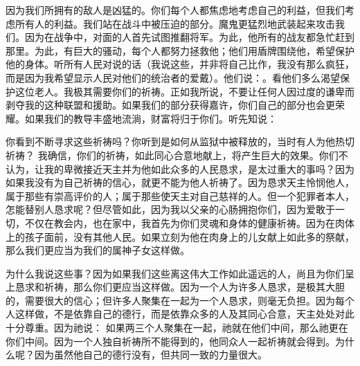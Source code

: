 因为我们所拥有的敌人是凶猛的。你们每个人都焦虑地考虑自己的利益，但我们考虑所有人的利益。我们站在战斗中被压迫的部分。魔鬼更猛烈地武装起来攻击我们。因为在战争中，对面的人首先试图推翻将军。为此，他所有的战友都急忙赶到那里。为此，有巨大的骚动，每个人都努力拯救他；他们用盾牌围绕他，希望保护他的身体。听所有人民对说的话（我说这些，并非将自己比作，我没有那么疯狂，而是因为我希望显示人民对他们的统治者的爱戴）。他们说：。看他们多么渴望保护这位老人。我极其需要你们的祈祷。正如我所说，不要让任何人因过度的谦卑而剥夺我的这种联盟和援助。如果我们的部分获得嘉许，你们自己的部分也会更荣耀。如果我们的教导丰盛地流淌，财富将归于你们。听先知说：\par

你看到不断寻求这些祈祷吗？你听到是如何从监狱中被释放的，当时有人为他热切祈祷？ 我确信，你们的祈祷，如此同心合意地献上，将产生巨大的效果。你们不认为，让我的卑微接近天主并为他如此众多的人民恳求，是太过重大的事吗？因为如果我没有为自己祈祷的信心，就更不能为他人祈祷了。因为恳求天主怜悯他人，属于那些有崇高评价的人；属于那些使天主对自己慈祥的人。但一个犯罪者本人，怎能替别人恳求呢？但尽管如此，因为我以父亲的心肠拥抱你们，因为爱敢于一切，不仅在教会内，也在家中，我首先为你们灵魂和身体的健康祈祷。因为在肉体上的孩子面前，没有其他人民。如果立刻为他在肉身上的儿女献上如此多的祭献，那么我们更应当为我们的属神子女这样做。\par

为什么我说这些事？因为如果我们这些离这伟大工作如此遥远的人，尚且为你们呈上恳求和祈祷，那么你们更应当这样做。因为一个人为许多人恳求，是极其大胆的，需要很大的信心；但许多人聚集在一起为一个人恳求，则毫无负担。因为每个人这样做，不是依靠自己的德行，而是依靠众多的人及其同心合意，天主处处对此十分尊重。因为祂说：  如果两三个人聚集在一起，祂就在他们中间，那么祂更在你们中间。因为一个人独自祈祷所不能得到的，他同众人一起祈祷就会得到。为什么呢？因为虽然他自己的德行没有，但共同一致的力量很大。\par

